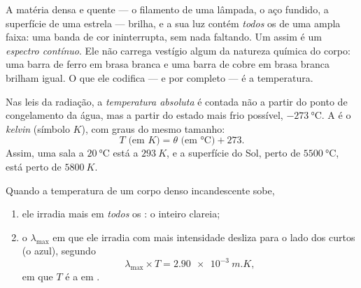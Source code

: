 \begin{definition}\label{def:g10:light-spectra:continuous}
A matéria densa e quente --- o filamento de uma lâmpada, o aço fundido, a
superfície de uma estrela --- brilha, e a sua luz contém \emph{todos} os
 de uma ampla faixa: uma banda de cor ininterrupta, sem
nada faltando. Um  assim é um \emph{espectro
contínuo}. Ele não carrega vestígio algum da
natureza química do corpo: uma barra de ferro em brasa branca e uma barra de
cobre em brasa branca brilham igual. O que ele codifica --- e por completo
--- é a temperatura.
\end{definition}

\begin{definition}\label{def:g10:light-spectra:kelvin}
Nas leis da radiação, a \emph{temperatura absoluta} é contada não a partir do ponto de congelamento da água, mas a
partir do estado mais frio possível, $\qty{-273}{\degreeCelsius}$. A 
é o \emph{kelvin} (símbolo $\unit{K}$), com graus do mesmo
tamanho:
\[
T \text{ (em } \unit{K}) = \theta \text{ (em } \unit{\degreeCelsius}) + 273 .
\]
Assim, uma sala a $\qty{20}{\degreeCelsius}$ está a $\qty{293}{K}$, e a
superfície do Sol, perto de $\qty{5500}{\degreeCelsius}$, está perto de
$\qty{5800}{K}$.
\end{definition}

\begin{proposition}\label{prop:g10:light-spectra:wien}
Quando a temperatura de um corpo denso incandescente sobe,
\begin{enumerate}
  \item ele irradia mais em \emph{todos} os : o 
        inteiro clareia;
  \item o  $\lambda_{\max}$ em que ele irradia com mais
        intensidade desliza para o lado dos  curtos (o
        azul), segundo
        \[
        \lambda_{\max} \times T = \qty{2.90e-3}{m.K},
        \]
        em que $T$ é a  em .
\end{enumerate}
\end{proposition}
\admitted

